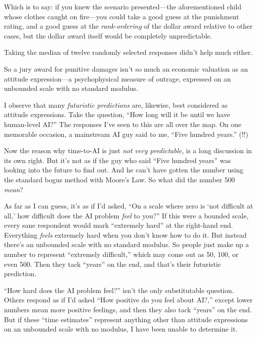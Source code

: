{
 Which is to say: if you knew the scenario presented---the
aforementioned child whose clothes caught on fire---you could take a
good guess at the punishment rating, and a good guess at the
\textit{rank-ordering} of the dollar award relative to other cases, but
the dollar award itself would be completely unpredictable.}

{
 Taking the median of twelve randomly selected responses
didn't help much either.}

{
 So a jury award for punitive damages isn't so much
an economic valuation as an attitude expression---a psychophysical
measure of outrage, expressed on an unbounded scale with no standard
modulus.}

{
 I observe that many \textit{futuristic predictions} are, likewise,
best considered as attitude expressions. Take the question,
``How long will it be until we have human-level
AI?'' The responses I've seen to this
are all over the map. On one memorable occasion, a mainstream AI guy
said to me, ``Five hundred years.''
(!!)}

{
 Now the reason why time-to-AI is just \textit{not very
predictable}, is a long discussion in its own right. But
it's not as if the guy who said ``Five
hundred years'' was looking into the future to find
out. And he can't have gotten the number using the
standard bogus method with Moore's Law. So what did the
number 500 \textit{mean}?}

{
 As far as I can guess, it's as if
I'd asked, ``On a scale where zero is
`not difficult at all,' how difficult
does the AI problem \textit{feel} to you?'' If this
were a bounded scale, every sane respondent would mark
``extremely hard'' at the right-hand
end. Everything \textit{feels} extremely hard when you
don't know how to do it. But instead
there's an unbounded scale with no standard modulus. So
people just make up a number to represent ``extremely
difficult,'' which may come out as 50, 100, or even
500. Then they tack ``years'' on the
end, and that's their futuristic prediction.}

{
 ``How hard does the AI problem
feel?'' isn't the only substitutable
question. Others respond as if I'd asked
``How positive do you feel about
AI?,'' except lower numbers mean more positive
feelings, and then they also tack
``years'' on the end. But if these
``time estimates'' represent
anything other than attitude expressions on an unbounded scale with no
modulus, I have been unable to determine it.}

\myendsectiontext



